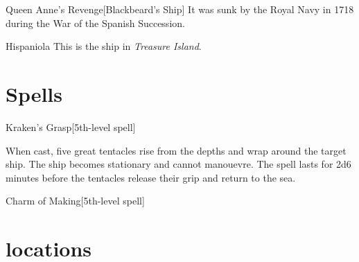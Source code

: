 \begin{rpgentity}{Queen Anne's Revenge}[Blackbeard's Ship]
    It was sunk by the Royal Navy in 1718 during the War of the Spanish Succession.
\end{rpgentity}

\begin{rpgentity}{Hispaniola}
    This is the ship in \emph{Treasure Island}.
\end{rpgentity}

\section{Spells}

\begin{rpgentity}{Kraken's Grasp}[5th-level spell]

    When cast, five great tentacles rise from the depths and wrap around the target ship. The ship becomes stationary and cannot manouevre. The spell lasts for 2d6 minutes before the tentacles release their grip and return to the sea.
\end{rpgentity}

\begin{rpgentity}{Charm of Making}[5th-level spell]
\end{rpgentity}

\lipsum[8]

\section{locations}




